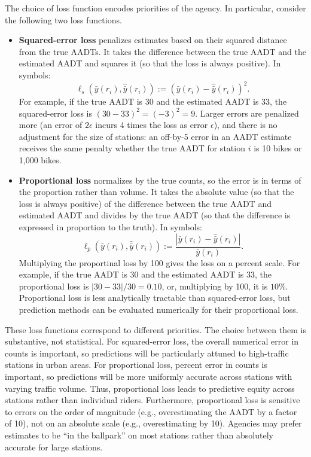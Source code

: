 \documentclass[11pt]{article}
\begin{document}
The choice of loss function encodes priorities of the agency. In
particular, consider the following two loss functions.

\begin{itemize}
\item
  \textbf{Squared-error loss} penalizes estimates based on their squared
  distance from the true AADTs. It takes the difference between the true
  AADT and the estimated AADT and squares it (so that the loss is always
  positive). In symbols:
  \[\ell_s(\bar{y}(r_i), \hat{\bar{y}}(r_i)) := (\bar{y}(r_i) - \hat{\bar{y}}(r_i))^2.\]
  For example, if the true AADT is 30 and the estimated AADT is 33, the
  squared-error loss is \((30 - 33)^2 = (-3)^2 = 9\). Larger errors are
  penalized more (an error of \(2 \epsilon\) incurs 4 times the loss as
  error \(\epsilon\)), and there is no adjustment for the size of
  stations: an off-by-5 error in an AADT estimate receives the same
  penalty whether the true AADT for station \(i\) is 10 bikes or 1,000
  bikes.
\item
  \textbf{Proportional loss} normalizes by the true counts, so the error
  is in terms of the proportion rather than volume. It takes the
  absolute value (so that the loss is always positive) of the difference
  between the true AADT and estimated AADT and divides by the true AADT
  (so that the difference is expressed in proportion to the truth). In
  symbols:
  \[\ell_p(\bar{y}(r_i), \hat{\bar{y}}(r_i)) := \frac{|\bar{y}(r_i) - \hat{\bar{y}}(r_i)|}{\bar{y}(r_i)}.\]
  Multiplying the proportinal loss by 100 gives the loss on a percent
  scale. For example, if the true AADT is 30 and the estimated AADT is
  33, the proportional loss is \(|30 - 33|/30 = 0.10\), or, multiplying
  by 100, it is \(10\%\). Proportional loss is less analytically
  tractable than squared-error loss, but prediction methods can be
  evaluated numerically for their proportional loss.
\end{itemize}

These loss functions correspond to different priorities. The choice
between them is substantive, not statistical. For squared-error loss,
the overall numerical error in counts is important, so predictions will
be particularly attuned to high-traffic stations in urban areas. For
proportional loss, percent error in counts is important, so predictions
will be more uniformly accurate across stations with varying traffic
volume. Thus, proportional loss leads to predictive equity across
stations rather than individual riders. Furthermore, proportional loss
is sensitive to errors on the order of magnitude (e.g., overestimating
the AADT by a factor of 10), not on an absolute scale (e.g.,
overestimating by 10). Agencies may prefer estimates to be ``in the
ballpark'' on most stations rather than absolutely accurate for large
stations.
\end{document}
